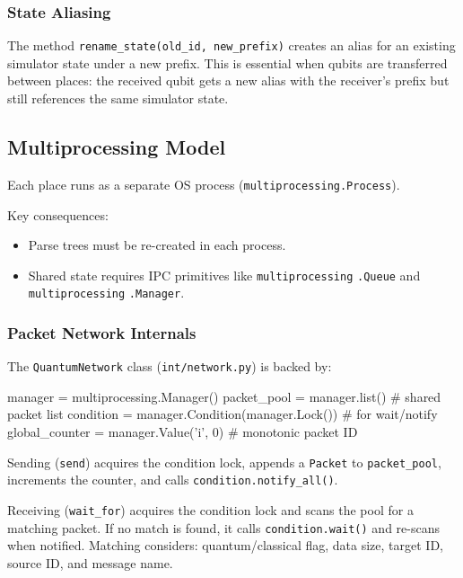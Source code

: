\subsubsection{State Aliasing}

The method \texttt{rename\_state(old\_id, new\_prefix)} creates an
alias for an existing simulator state under a new prefix.  This is essential
when qubits are transferred between places: the received qubit gets a new
alias with the receiver's prefix but still references the same simulator
state.

\subsection{Multiprocessing Model}
\label{sec:impl-multiprocessing}

Each place runs as a separate OS process
(\texttt{multiprocessing.Process}).

Key consequences:
\begin{itemize}
    \item Parse trees must be re-created in each process.
    \item Shared state requires IPC primitives like
          \texttt{multiprocessing} \texttt{.Queue} and
          \texttt{multiprocessing} \texttt{.Manager}.
\end{itemize}

\subsubsection{Packet Network Internals}

The \texttt{QuantumNetwork} class (\texttt{int/network.py}) is backed by:

\begin{codebox}
manager      = multiprocessing.Manager()
packet_pool  = manager.list()                    # shared packet list
condition    = manager.Condition(manager.Lock())  # for wait/notify
global_counter = manager.Value('i', 0)           # monotonic packet ID
\end{codebox}

Sending (\texttt{send}) acquires the condition lock, appends a
\texttt{Packet} to \texttt{packet\_pool}, increments the counter, and calls
\texttt{condition.notify\_all()}.

Receiving (\texttt{wait\_for}) acquires the condition lock and
scans the pool for a matching packet.  If no match is found, it calls
\texttt{condition.wait()} and re-scans when notified.  Matching considers:
quantum/classical flag, data size, target ID, source ID, and message name.


